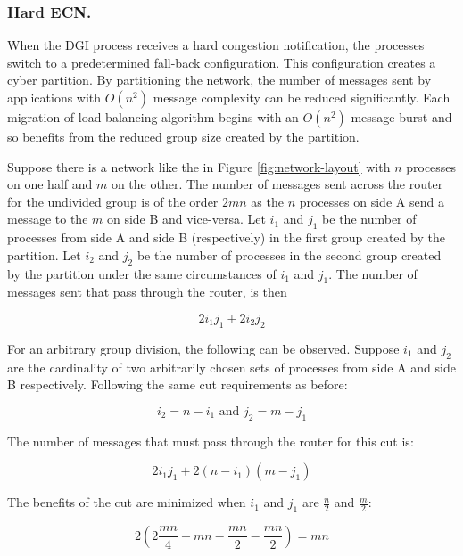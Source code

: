 \subsubsection{Hard \ac{ECN}.}

When the \ac{DGI} process receives a hard congestion notification, the processes switch to a predetermined fall-back configuration.
This configuration creates a cyber partition.
By partitioning the network, the number of messages sent by applications with $O(n^2)$ message complexity can be reduced significantly.
Each migration of load balancing algorithm begins with an $O(n^2)$ message burst and so benefits from the reduced group size created by the partition.

Suppose there is a network like the in Figure \ref{fig:network-layout} with $n$ processes on one half and $m$ on the other.
The number of messages sent across the router for the undivided group is of the order $2mn$ as the $n$ processes on side A send a message to the $m$ on side B and vice-versa.
Let $i_{1}$ and $j_{1}$ be the number of processes from side A and side B (respectively) in the first group created by the partition.
Let $i_{2}$ and $j_{2}$ be the number of processes in the second group created by the partition under the same circumstances of $i_1$ and $j_1$.
The number of messages sent that pass through the router, is then 

\begin{equation}
2 i_{1} j_{1} + 2 i_{2} j_{2}
\end{equation}

For an arbitrary group division, the following can be observed.
Suppose $i_{1}$ and $j_{2}$ are the cardinality of two arbitrarily chosen sets of processes from side A and side B respectively.
Following the same cut requirements as before:

\begin{equation}
i_2 = n - i_1 \text{ and } j_2 = m - j_1
\end{equation}

The number of messages that must pass through the router for this cut is:

\begin{equation}
2 i_{1} j_{1} + 2 (n-i_{1}) (m-j_{1})
\end{equation}

The benefits of the cut are minimized when $i_1$ and $j_1$ are $\frac{n}{2}$ and $\frac{m}{2}$:

\begin{equation}
2( 2 \frac{mn}{4} + mn - \frac{mn}{2} - \frac{mn}{2}) = mn
\end{equation}

